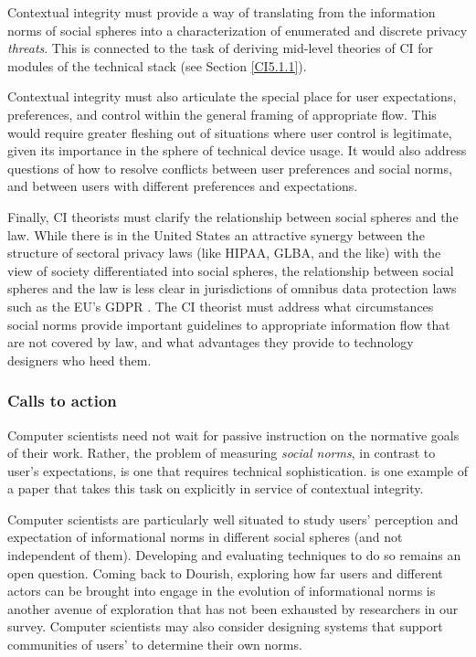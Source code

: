 \documentclass[../thesis.tex]{subfiles}
\begin{document}
Contextual integrity must provide a way of translating from the
information norms of social spheres into a characterization of
enumerated and discrete privacy \textit{threats}. This is connected to
the task of deriving mid-level theories of CI for modules of the
technical stack (see Section \ref{CI5.1.1}).

Contextual integrity must also articulate the special place for user
expectations, preferences, and control within the general framing of
appropriate flow. This would require greater fleshing out of situations
where user control is legitimate, given its importance in the sphere of
technical device usage. It would also address questions of how to
resolve conflicts between user preferences and social norms, and
between users with different preferences and expectations.

Finally, CI theorists must clarify the relationship between social
spheres and the law. While there is in the United States an attractive
synergy between the structure of sectoral privacy laws (like HIPAA,
GLBA, and the like) with the view of society differentiated into social
spheres, the relationship between social spheres and the law is less
clear in jurisdictions of omnibus data protection laws such as the
EU's GDPR \cite{regulation2016regulation}.
The CI theorist must
address what circumstances social norms provide important guidelines to
appropriate information flow that are not covered by law, and what
advantages they provide to technology designers who heed them.

\subsubsection{Calls to action}
\label{CI5.3.2}

Computer scientists need not wait for passive instruction on the
normative goals of their work. Rather, the problem of measuring
\textit{social norms}, in contrast to user's
expectations, is one that requires technical sophistication.
\citet{shvartzshnaider2016learning} is one example of a paper that takes this
task on explicitly in service of contextual integrity.

Computer scientists are particularly well situated to study
users' perception and expectation of informational
norms in different social spheres (and not independent of them).
Developing and evaluating techniques to do so remains an open question.
Coming back to Dourish, exploring how far users and different actors
can be brought into engage in the evolution of informational norms is
another avenue of exploration that has not been exhausted by
researchers in our survey. Computer scientists may also consider
designing systems that support communities of users' to
determine their own norms.
\end{document}

